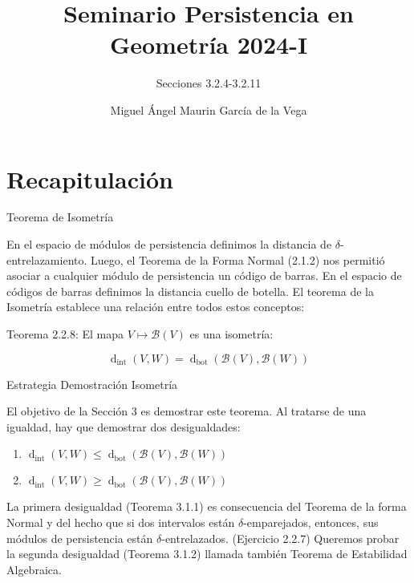 \documentclass{beamer}
\title{Seminario Persistencia en Geometría 2024-I}
\subtitle{Secciones 3.2.4-3.2.11}
\author{Miguel Ángel Maurin García de la Vega}
\newcounter{Ejercicio}
\def\dint{\operatorname{d}_{\operatorname{int}}}
\def\dbot{\operatorname{d}_{\operatorname{bot}}}
\begin{document}
\frenchspacing


  \frame{\maketitle}


    \section{Recapitulación}

    \begin{frame}{Teorema de Isometría}

En el espacio de módulos de persistencia definimos la distancia de $\delta$-entrelazamiento.
\pause
Luego, el Teorema de la Forma Normal (2.1.2) nos permitió asociar a cualquier módulo de persistencia un código de barras. 
\pause
En el espacio de códigos de barras definimos la distancia cuello de botella.
\pause
El teorema de la Isometría establece una relación entre todos estos conceptos:
 
\begin{block}{Teorema 2.2.8:}
El mapa \(V \mapsto \mathcal{B}(V)\) es una isometría:

\[\dint(V,W) = \dbot(\mathcal{B}(V),\mathcal{B}(W))\]
\end{block}
\end{frame}
    
\begin{frame}{Estrategia Demostración Isometría}

El objetivo de la Sección 3 es demostrar este teorema. Al tratarse de una igualdad, hay que demostrar dos desigualdades: 
\pause

\begin{enumerate}
  \item \(\dint(V,W) \leq \dbot(\mathcal{B}(V),\mathcal{B}(W))\)
  \pause
  \item \(\dint(V,W) \geq \dbot(\mathcal{B}(V),\mathcal{B}(W))\)
\end{enumerate}
\pause
La primera desigualdad (Teorema 3.1.1) es consecuencia del Teorema de la forma Normal y del hecho que si dos intervalos están $\delta$-emparejados, entonces, sus módulos de persistencia están $\delta$-entrelazados. (Ejercicio 2.2.7)
\pause
Queremos probar la segunda desigualdad (Teorema 3.1.2) llamada también Teorema de Estabilidad Algebraica.
\end{frame}
\end{document}
